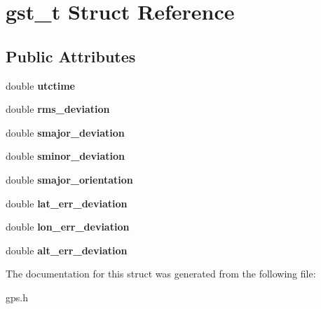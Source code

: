 \hypertarget{structgst__t}{\section{gst\-\_\-t \-Struct \-Reference}
\label{structgst__t}
}
\subsection*{\-Public \-Attributes}
\begin{DoxyCompactItemize}
\item 
\hypertarget{structgst__t_a58e767160888b189d461099af695a254}{double {\bfseries utctime}}\label{structgst__t_a58e767160888b189d461099af695a254}

\item 
\hypertarget{structgst__t_a8c2509fe6443415a4970a3b2f5a04ff5}{double {\bfseries rms\-\_\-deviation}}\label{structgst__t_a8c2509fe6443415a4970a3b2f5a04ff5}

\item 
\hypertarget{structgst__t_ac3cba085f3fe7b294011f599646ffe01}{double {\bfseries smajor\-\_\-deviation}}\label{structgst__t_ac3cba085f3fe7b294011f599646ffe01}

\item 
\hypertarget{structgst__t_acf80b6a7d04a9b9de4541c00972ec7cc}{double {\bfseries sminor\-\_\-deviation}}\label{structgst__t_acf80b6a7d04a9b9de4541c00972ec7cc}

\item 
\hypertarget{structgst__t_acbe36d613d7786659cb3f157dfb4aade}{double {\bfseries smajor\-\_\-orientation}}\label{structgst__t_acbe36d613d7786659cb3f157dfb4aade}

\item 
\hypertarget{structgst__t_a45a82edafeafca5d57b7daeff42d5572}{double {\bfseries lat\-\_\-err\-\_\-deviation}}\label{structgst__t_a45a82edafeafca5d57b7daeff42d5572}

\item 
\hypertarget{structgst__t_a2007d9a8afe3b60e7d2561f190becade}{double {\bfseries lon\-\_\-err\-\_\-deviation}}\label{structgst__t_a2007d9a8afe3b60e7d2561f190becade}

\item 
\hypertarget{structgst__t_ad8c3fc0893964650dbe427de6c8dd548}{double {\bfseries alt\-\_\-err\-\_\-deviation}}\label{structgst__t_ad8c3fc0893964650dbe427de6c8dd548}

\end{DoxyCompactItemize}


\-The documentation for this struct was generated from the following file\-:\begin{DoxyCompactItemize}
\item 
gps.\-h\end{DoxyCompactItemize}
